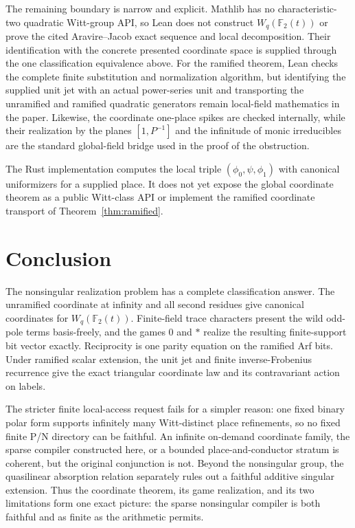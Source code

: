 \documentclass[11pt]{article}
\theoremstyle{definition}
\theoremstyle{remark}
\newcommand{\F}{\mathbb{F}}
\begin{document}
The remaining boundary is narrow and explicit.  Mathlib has no
characteristic-two quadratic Witt-group API, so Lean does not construct
$W_q(\F_2(t))$ or prove the cited Aravire--Jacob exact sequence and local
decomposition.  Their identification with the concrete presented coordinate
space is supplied through the one classification equivalence above.  For the
ramified theorem, Lean checks the complete finite substitution and
normalization algorithm, but identifying the supplied unit jet with an actual
power-series unit and transporting the unramified and ramified quadratic
generators remain local-field mathematics in the paper.  Likewise, the
coordinate one-place spikes are checked internally, while their realization
by the planes $[1,P^{-1}]$ and the infinitude of monic irreducibles are the
standard global-field bridge used in the proof of the obstruction.

The Rust implementation computes the local triple
$(\phi_0,\psi,\phi_1)$ with canonical uniformizers for a supplied place.  It
does not yet expose the global coordinate theorem as a public Witt-class API
or implement the ramified coordinate transport of
Theorem~\ref{thm:ramified}.

\section{Conclusion}

The nonsingular realization problem has a complete classification answer.
The unramified coordinate at infinity and all second residues give canonical
coordinates for $W_q(\F_2(t))$.  Finite-field trace characters present the
wild odd-pole terms basis-freely, and the games $0$ and $*$ realize the
resulting finite-support bit vector exactly.  Reciprocity is one parity
equation on the ramified Arf bits.  Under ramified scalar extension, the unit
jet and finite inverse-Frobenius recurrence give the exact triangular
coordinate law and its contravariant action on labels.

The stricter finite local-access request fails for a simpler reason: one fixed
binary polar form supports infinitely many Witt-distinct place refinements,
so no fixed finite P/N directory can be faithful.  An infinite on-demand
coordinate family, the sparse compiler constructed here, or a bounded
place-and-conductor stratum is coherent, but the original conjunction is not.
Beyond the nonsingular group, the quasilinear absorption relation separately
rules out a faithful additive singular extension.  Thus the coordinate
theorem, its game realization, and its two limitations form one exact picture:
the sparse nonsingular compiler is both faithful and as finite as the
arithmetic permits.

\small


\end{document}
